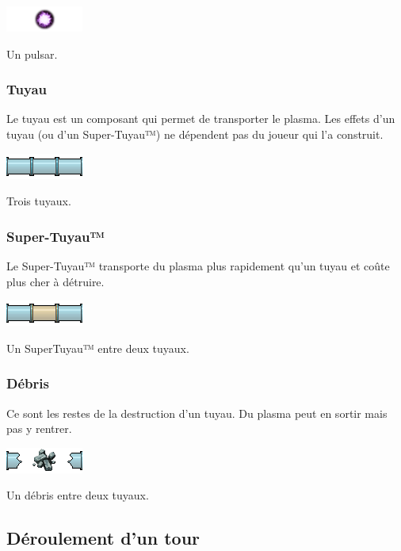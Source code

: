 \includegraphics{asset/pulsar.png}

{Un pulsar.}

\subsubsection{Tuyau}\label{tuyau}

Le tuyau est un composant qui permet de transporter le plasma. Les
effets d'un tuyau (ou d'un Super-Tuyau™) ne dépendent pas du joueur qui
l'a construit.

\includegraphics{asset/tuyau.png}

{Trois tuyaux.}

\subsubsection{Super-Tuyau™}\label{super-tuyau}

Le Super-Tuyau™ transporte du plasma plus rapidement qu'un tuyau et
coûte plus cher à détruire.

\includegraphics{asset/supertuyau.png}

{Un SuperTuyau™ entre deux tuyaux.}

\subsubsection{Débris}\label{duxe9bris}

Ce sont les restes de la destruction d'un tuyau. Du plasma peut en
sortir mais pas y rentrer.

\includegraphics{asset/debris.png}

{Un débris entre deux tuyaux.}

\subsection{Déroulement d'un tour}\label{duxe9roulement-dun-tour}

